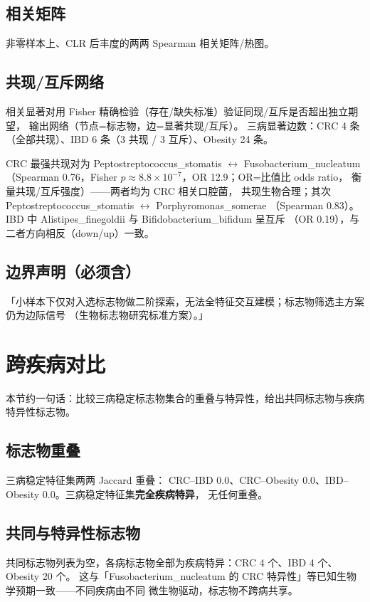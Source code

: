 \documentclass{internal-report}
\begin{document}
\subsection{相关矩阵}
非零样本上、CLR 后丰度的两两 Spearman 相关矩阵/热图。

\subsection{共现/互斥网络}
相关显著对用 Fisher 精确检验（存在/缺失标准）验证同现/互斥是否超出独立期望，
输出网络（节点=标志物，边=显著共现/互斥）。
三病显著边数：CRC 4 条（全部共现）、IBD 6 条（3 共现 / 3 互斥）、Obesity 24 条。

CRC 最强共现对为 Peptostreptococcus\_stomatis $\leftrightarrow$ Fusobacterium\_nucleatum
（Spearman 0.76，Fisher $p\approx8.8\times10^{-7}$，OR 12.9；OR=比值比 odds ratio，
衡量共现/互斥强度）——两者均为 CRC 相关口腔菌，
共现生物合理；其次 Peptostreptococcus\_stomatis $\leftrightarrow$ Porphyromonas\_somerae
（Spearman 0.83）。IBD 中 Alistipes\_finegoldii 与 Bifidobacterium\_bifidum 呈互斥
（OR 0.19），与二者方向相反（down/up）一致。

\subsection{边界声明（必须含）}
「小样本下仅对入选标志物做二阶探索，无法全特征交互建模；标志物筛选主方案仍为边际信号
（生物标志物研究标准方案）。」

\section{跨疾病对比}
本节约一句话：比较三病稳定标志物集合的重叠与特异性，给出共同标志物与疾病特异性标志物。

\subsection{标志物重叠}
三病稳定特征集两两 Jaccard 重叠：
CRC--IBD 0.0、CRC--Obesity 0.0、IBD--Obesity 0.0。三病稳定特征集\textbf{完全疾病特异}，
无任何重叠。

\subsection{共同与特异性标志物}
共同标志物列表为空，各病标志物全部为疾病特异：CRC 4 个、IBD 4 个、Obesity 20 个。
这与「Fusobacterium\_nucleatum 的 CRC 特异性」等已知生物学预期一致——不同疾病由不同
微生物驱动，标志物不跨病共享。
\end{document}
